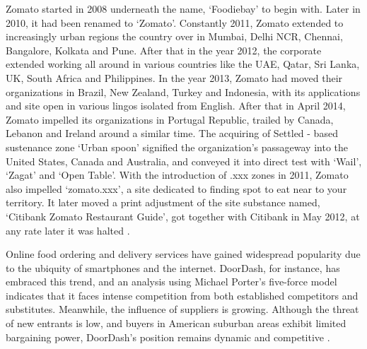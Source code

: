 Zomato started in 2008 underneath the name, ‘Foodiebay’ to begin with. Later in 2010, it had been renamed to ‘Zomato’. Constantly 2011, Zomato extended to increasingly urban regions the country over in Mumbai, Delhi NCR, Chennai, Bangalore, Kolkata and Pune. After that in the year 2012, the corporate extended working all around in various countries like the UAE, Qatar, Sri Lanka, UK, South Africa and Philippines. In the year 2013, Zomato had moved their organizations in Brazil, New Zealand, Turkey and Indonesia, with its applications and site open in various lingos isolated from English. After that in April 2014, Zomato impelled its organizations in Portugal Republic, trailed by Canada, Lebanon and Ireland around a similar time. The acquiring of Settled - based sustenance zone ‘Urban spoon’ signified the organization’s passageway into the United States, Canada and Australia, and conveyed it into direct test with ‘Wail’, ‘Zagat' and ‘Open Table’. With the introduction of .xxx zones in 2011, Zomato also impelled ‘zomato.xxx’, a site dedicated to finding spot to eat near to your territory. It later moved a print adjustment of the site substance named, ‘Citibank Zomato Restaurant Guide’, got together with Citibank in May 2012, at any rate later it was halted \cite{panigrahi2020case}.

Online food ordering and delivery services have gained widespread popularity due to the ubiquity of smartphones and the internet. DoorDash, for instance, has embraced this trend, and an analysis using Michael Porter's five-force model indicates that it faces intense competition from both established competitors and substitutes. Meanwhile, the influence of suppliers is growing. Although the threat of new entrants is low, and buyers in American suburban areas exhibit limited bargaining power, DoorDash's position remains dynamic and competitive \cite{zhang2021qualitative}.






